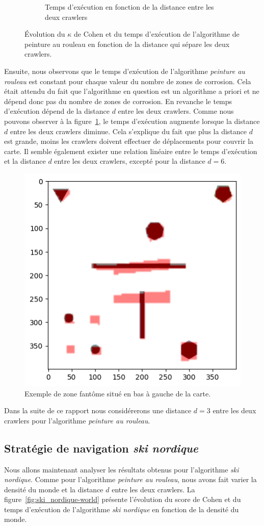 \documentclass[francais,RandD]{rapportPFE}
\begin{document}
\begin{figure}[h!]
\begin{subfigure}[t]{0.49\linewidth}
						\caption{Temps d'exécution en fonction de la distance entre les deux crawlers}
						\label{fig:peinture_au_rouleau-time_vs_distance}
				\end{subfigure}
				\caption{Évolution du $\kappa$ de Cohen et du temps d'exécution de l'algorithme de peinture au rouleau en fonction de la distance qui sépare les deux crawlers.}
				\label{fig:peinture_au_rouleau-distance}
			\end{figure}

			Ensuite, nous observons que le temps d'exécution de l'algorithme \textit{peinture au rouleau} est constant pour chaque valeur du nombre de zones de corrosion.
			Cela était attendu du fait que l'algorithme en question est un algorithme a priori et ne dépend donc pas du nombre de zones de corrosion.
			En revanche le temps d'exécution dépend de la distance $d$ entre les deux crawlers.
			Comme nous pouvons observer à la figure~\ref{fig:peinture_au_rouleau-time_vs_distance}, le temps d'exécution augmente lorsque la distance $d$ entre les deux crawlers diminue.
			Cela s'explique du fait que plus la distance $d$ est grande, moins les crawlers doivent effectuer de déplacements pour couvrir la carte.
			Il semble également exister une relation linéaire entre le temps d'exécution et la distance $d$ entre les deux crawlers, excepté pour la distance $d = 6$.

			\begin{figure}[h!]
				\centering
				\includegraphics[width=0.5\linewidth]{graphics/output.png}
				\caption{Exemple de zone fantôme situé en bas à gauche de la carte.}
				\label{fig:ghost_zone}
			\end{figure}

			Dans la suite de ce rapport nous considérerons une distance $d = 3$ entre les deux crawlers pour l'algorithme \textit{peinture au rouleau}.
		\subsection*{Stratégie de navigation \textit{ski nordique}}
			Nous allons maintenant analyser les résultats obtenus pour l'algorithme \textit{ski nordique}.
			Comme pour l'algorithme \textit{peinture au rouleau}, nous avons fait varier la densité du monde et la distance $d$ entre les deux crawlers.
			La figure~\ref{fig:ski_nordique-world} présente l'évolution du score de Cohen et du temps d'exécution de l'algorithme \textit{ski nordique} en fonction de la densité du monde.
\end{document}
